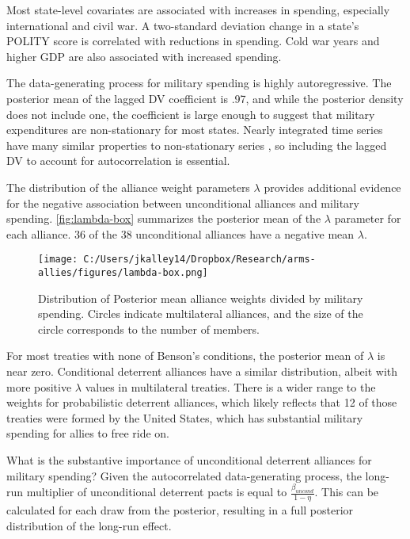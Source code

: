 \documentclass[12pt]{article}
\begin{document}
Most state-level covariates are associated with increases in spending, especially international and civil war. A two-standard deviation change in a state's POLITY score is correlated with reductions in spending. Cold war years and higher GDP are also associated with increased spending.

The data-generating process for military spending is highly autoregressive. The posterior mean of the lagged DV coefficient is .97, and while the posterior density does not include one, the coefficient is large enough to suggest that military expenditures are non-stationary for most states. Nearly integrated time series have many similar properties to non-stationary series \citep{DeBoefGranato1997}, so including the lagged DV to account for autocorrelation is essential. 

The distribution of the alliance weight parameters $\lambda$ provides additional evidence for the negative association between unconditional alliances and military spending. \autoref{fig:lambda-box} summarizes the posterior mean of the $\lambda$ parameter for each alliance. 36 of the 38 unconditional alliances have a negative mean $\lambda$.  

\begin{figure}[htbp]
	\centering
		\texttt{[image: C:/Users/jkalley14/Dropbox/Research/arms-allies/figures/lambda-box.png]}
	\caption{Distribution of Posterior mean alliance weights divided by military spending. Circles indicate multilateral alliances, and the size of the circle corresponds to the number of members.}
	\label{fig:lambda-box}
\end{figure}

For most treaties with none of Benson's conditions, the posterior mean of $\lambda$ is near zero. Conditional deterrent alliances have a similar distribution, albeit with more positive $\lambda$ values in multilateral treaties. There is a wider range to the weights for probabilistic deterrent alliances, which likely reflects that 12 of those treaties were formed by the United States, which has substantial military spending for allies to free ride on. 

What is the substantive importance of unconditional deterrent alliances for military spending? Given the autocorrelated data-generating process, the long-run multiplier of unconditional deterrent pacts is equal to $\frac{\beta_{uncond}}{ 1 - \eta}$. This can be calculated for each draw from the posterior, resulting in a full posterior distribution of the long-run effect. 
\end{document}
